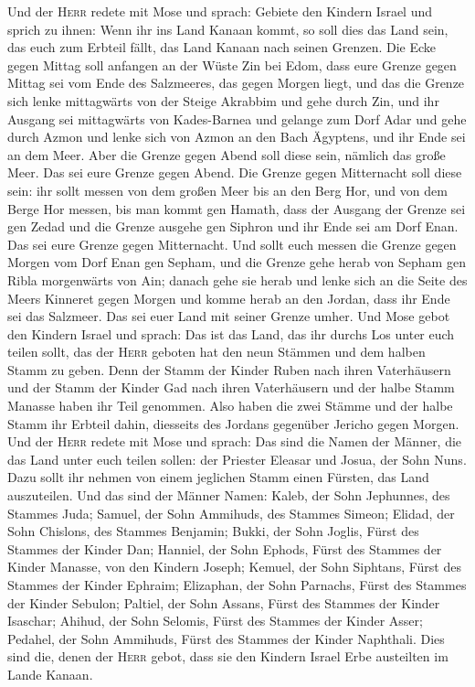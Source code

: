  Und der \textsc{Herr} redete mit Mose und sprach:
 Gebiete den Kindern Israel und sprich zu ihnen: Wenn ihr
ins Land Kanaan kommt, so soll dies das Land sein, das euch zum Erbteil
fällt, das Land Kanaan nach seinen Grenzen.  Die Ecke
gegen Mittag soll anfangen an der Wüste Zin bei Edom, dass eure Grenze
gegen Mittag sei vom Ende des Salzmeeres, das gegen Morgen liegt,
 und das die Grenze sich lenke mittagwärts von der Steige
Akrabbim und gehe durch Zin, und ihr Ausgang sei mittagwärts von
Kades-Barnea und gelange zum Dorf Adar und gehe durch Azmon
 und lenke sich von Azmon an den Bach Ägyptens, und ihr
Ende sei an dem Meer.  Aber die Grenze gegen Abend soll
diese sein, nämlich das große Meer. Das sei eure Grenze gegen Abend.
 Die Grenze gegen Mitternacht soll diese sein: ihr sollt
messen von dem großen Meer bis an den Berg Hor,  und von
dem Berge Hor messen, bis man kommt gen Hamath, dass der Ausgang der
Grenze sei gen Zedad  und die Grenze ausgehe gen Siphron
und ihr Ende sei am Dorf Enan. Das sei eure Grenze gegen Mitternacht.
 Und sollt euch messen die Grenze gegen Morgen vom Dorf
Enan gen Sepham,  und die Grenze gehe herab von Sepham
gen Ribla morgenwärts von Ain; danach gehe sie herab und lenke sich an
die Seite des Meers Kinneret gegen Morgen  und komme
herab an den Jordan, dass ihr Ende sei das Salzmeer. Das sei euer Land
mit seiner Grenze umher.  Und Mose gebot den Kindern
Israel und sprach: Das ist das Land, das ihr durchs Los unter euch
teilen sollt, das der \textsc{Herr} geboten hat den neun Stämmen und dem
halben Stamm zu geben.  Denn der Stamm der Kinder Ruben
nach ihren Vaterhäusern und der Stamm der Kinder Gad nach ihren
Vaterhäusern und der halbe Stamm Manasse haben ihr Teil genommen.
 Also haben die zwei Stämme und der halbe Stamm ihr
Erbteil dahin, diesseits des Jordans gegenüber Jericho gegen Morgen.
 Und der \textsc{Herr} redete mit Mose und sprach:
 Das sind die Namen der Männer, die das Land unter euch
teilen sollen: der Priester Eleasar und Josua, der Sohn Nuns.
 Dazu sollt ihr nehmen von einem jeglichen Stamm einen
Fürsten, das Land auszuteilen.  Und das sind der Männer
Namen: Kaleb, der Sohn Jephunnes, des Stammes Juda; 
Samuel, der Sohn Ammihuds, des Stammes Simeon;  Elidad,
der Sohn Chislons, des Stammes Benjamin;  Bukki, der Sohn
Joglis, Fürst des Stammes der Kinder Dan;  Hanniel, der
Sohn Ephods, Fürst des Stammes der Kinder Manasse, von den Kindern
Joseph;  Kemuel, der Sohn Siphtans, Fürst des Stammes der
Kinder Ephraim;  Elizaphan, der Sohn Parnachs, Fürst des
Stammes der Kinder Sebulon;  Paltiel, der Sohn Assans,
Fürst des Stammes der Kinder Isaschar;  Ahihud, der Sohn
Selomis, Fürst des Stammes der Kinder Asser;  Pedahel,
der Sohn Ammihuds, Fürst des Stammes der Kinder Naphthali.
 Dies sind die, denen der \textsc{Herr} gebot, dass sie
den Kindern Israel Erbe austeilten im Lande Kanaan.

